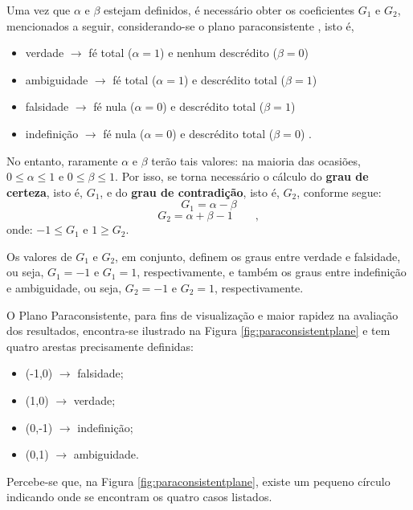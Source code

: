 			\par Uma vez que $\alpha$ e $\beta$ estejam definidos, é necessário obter os coeficientes $G_1$ e $G_2$, mencionados a seguir, considerando-se o plano paraconsistente \cite{XXXXXX}, isto é,  
				
				\begin{itemize}
					\item verdade $\rightarrow$ fé total ($\alpha = 1$) e nenhum descrédito ($\beta = 0$)
					\item ambiguidade $\rightarrow$ fé total ($\alpha = 1$) e descrédito total ($\beta = 1$)
					\item falsidade $\rightarrow$ fé nula ($\alpha = 0$) e descrédito total ($\beta = 1$)
					\item indefinição $\rightarrow$ fé nula ($\alpha = 0$) e descrédito total ($\beta = 0$) \qquad.
				\end{itemize}
				
				\par No entanto, raramente $\alpha$ e $\beta$ terão tais valores: na maioria das ocasiões, $0 \leqslant \alpha \leqslant 1$ e $0 \leqslant \beta \leqslant 1$. Por isso, se torna necessário o cálculo do \textbf{grau de certeza}, isto é, $G_1$, e do \textbf{grau de contradição}, isto é, $G_2$, conforme segue:
				\begin{equation}
					G_1=\alpha-\beta 
				\end{equation}
				\begin{equation}
					G_2=\alpha+\beta-1 \qquad,
				\end{equation}
			onde: $-1 \leqslant G_1$ e  $1 \geqslant G_2$.

			\par Os valores de $G_1$ e $G_2$, em conjunto, definem os graus entre verdade e falsidade, ou seja, $G_1=-1$ e $G_1=1$, respectivamente, e também os graus entre indefinição e ambiguidade, ou seja, $G_2=-1$ e $G_2=1$, respectivamente.
		
			\par O Plano Paraconsistente, para fins de visualização e maior rapidez na avaliação dos resultados, encontra-se ilustrado na Figura \ref{fig:paraconsistentplane} e tem quatro arestas precisamente definidas:
			\begin{itemize}
				\item (-1,0) $\rightarrow$ falsidade;
				\item (1,0) $\rightarrow$ verdade;
				\item (0,-1) $\rightarrow$ indefinição;
				\item (0,1) $\rightarrow$ ambiguidade.
			\end{itemize}
			\par Percebe-se que, na Figura \ref{fig:paraconsistentplane}, existe um pequeno círculo indicando onde se encontram os quatro casos listados.
	
